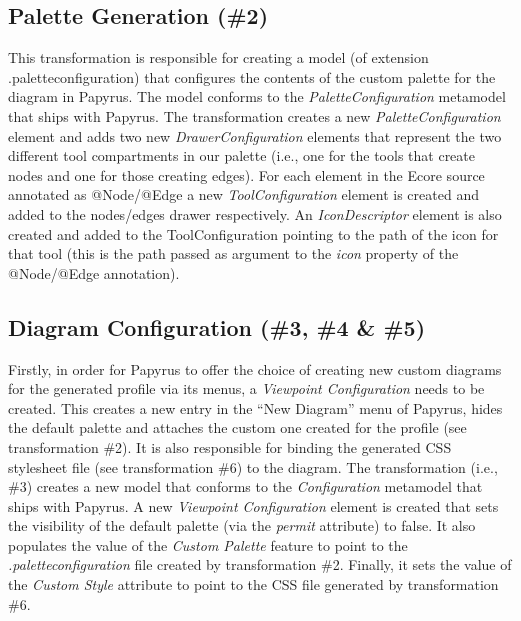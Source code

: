 

\subsection{Palette Generation (\#2)}
\label{sec:paletteGeneration}
This transformation is responsible for creating a model (of extension 
.paletteconfiguration) that configures the contents of the custom palette for 
the diagram in Papyrus. The model conforms to the \textit{PaletteConfiguration} 
metamodel that ships with Papyrus. The transformation creates a new 
\textit{PaletteConfiguration} element and adds two new 
\textit{DrawerConfiguration} elements that represent the two different tool 
compartments in our palette (i.e., one for the tools that create nodes and one 
for those creating edges). For each element in the Ecore source annotated as 
@Node/@Edge a new \textit{ToolConfiguration} element is created and added to 
the nodes/edges drawer respectively. An \textit{IconDescriptor} element is also 
created and added to the ToolConfiguration pointing to the path of the icon for 
that tool (this is the path passed as argument to the \textit{icon} property of 
the @Node/@Edge annotation).

\subsection{Diagram Configuration (\#3, \#4 \& \#5)}
\label{sec:diagramConfiguration}
Firstly, in order for Papyrus to offer the choice of creating new custom diagrams for the generated profile via its menus, a \textit{Viewpoint Configuration} needs to be created. This creates a new entry in the ``New Diagram'' menu of Papyrus, hides the default palette and attaches the custom one created for the profile (see transformation \#2). It is also responsible for binding the generated CSS stylesheet file (see transformation \#6) to the diagram. The transformation (i.e., \#3) creates a new model that conforms to the \textit{Configuration} metamodel that ships with Papyrus. A new \textit{Viewpoint Configuration} element is created that sets the visibility of the default palette (via the \textit{permit} attribute) to false. It also populates the value of the \textit{Custom Palette} feature to point to the \emph{.paletteconfiguration} file created by transformation \#2. Finally, it sets the value of the \textit{Custom Style} attribute to point to the CSS file generated by transformation \#6.

